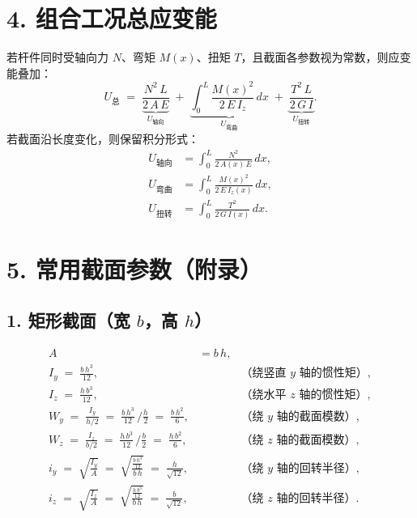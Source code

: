 \documentclass[12pt,a4paper]{article}
\begin{document}
\section*{4. 组合工况总应变能}

若杆件同时受轴向力 \(N\)、弯矩 \(M(x)\)、扭矩 \(T\)，且截面各参数视为常数，则应变能叠加：
\[
U_{\text{总}} \;=\; 
\underbrace{\frac{N^2\,L}{2\,A\,E}}_{U_{\text{轴向}}}
\;+\; 
\underbrace{\int_{0}^{L} \frac{M(x)^2}{2\,E\,I_z}\,dx}_{U_{\text{弯曲}}}
\;+\; 
\underbrace{\frac{T^2\,L}{2\,G\,I}}_{U_{\text{扭转}}}.
\]
若截面沿长度变化，则保留积分形式：
\begin{align}
U_{\text{轴向}} &= \int_{0}^{L} \frac{N^2}{2\,A(x)\,E}\,dx,\\
U_{\text{弯曲}} &= \int_{0}^{L} \frac{M(x)^2}{2\,E\,I_z(x)}\,dx,\\
U_{\text{扭转}} &= \int_{0}^{L} \frac{T^2}{2\,G\,I(x)}\,dx.
\end{align}

\section*{5. 常用截面参数（附录）}

\subsection*{1. 矩形截面（宽 $b$，高 $h$）}
\begin{align}
  A &= b\,h, \\[6pt]
  I_y \;=\; \frac{b\,h^3}{12}, 
    &\quad &\text{（绕竖直 $y$ 轴的惯性矩）},\\[6pt]
  I_z \;=\; \frac{h\,b^3}{12}, 
    &\quad &\text{（绕水平 $z$ 轴的惯性矩）},\\[6pt]
  W_y \;=\; \frac{I_y}{h/2} 
    \;=\; \frac{b\,h^3}{12}\,\Big/\frac{h}{2} 
    \;=\; \frac{b\,h^2}{6}, 
    &\quad &\text{（绕 $y$ 轴的截面模数）},\\[6pt]
  W_z \;=\; \frac{I_z}{b/2} 
    \;=\; \frac{h\,b^3}{12}\,\Big/\frac{b}{2} 
    \;=\; \frac{h\,b^2}{6}, 
    &\quad &\text{（绕 $z$ 轴的截面模数）},\\[6pt]
  i_y \;=\; \sqrt{\frac{I_y}{A}} 
    \;=\; \sqrt{\frac{\tfrac{b\,h^3}{12}}{b\,h}} 
    \;=\; \frac{h}{\sqrt{12}}, 
    &\quad &\text{（绕 $y$ 轴的回转半径）},\\[6pt]
  i_z \;=\; \sqrt{\frac{I_z}{A}} 
    \;=\; \sqrt{\frac{\tfrac{h\,b^3}{12}}{b\,h}} 
    \;=\; \frac{b}{\sqrt{12}}, 
    &\quad &\text{（绕 $z$ 轴的回转半径）}.
\end{align}
\end{document}
